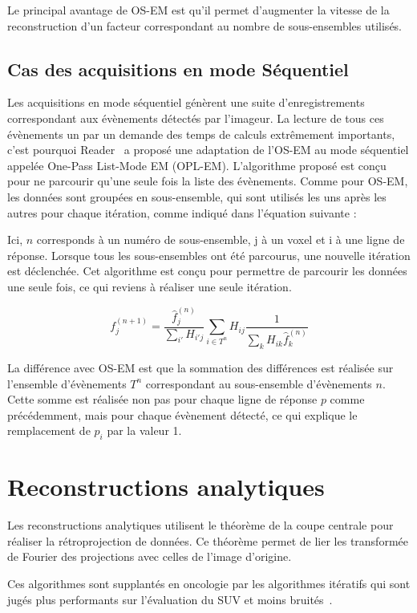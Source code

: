 Le principal avantage de OS-EM est qu'il permet d'augmenter la vitesse de la reconstruction d'un facteur correspondant au nombre de sous-ensembles utilisés.

	\subsection{Cas des acquisitions en mode Séquentiel}
\label{lab:OPLEM}

Les acquisitions en mode séquentiel génèrent une suite d'enregistrements correspondant aux évènements détectés par l'imageur. La lecture de tous ces évènements un par un demande des temps de calculs extrêmement importants, c'est pourquoi Reader~\cite{reader2002one} a proposé une adaptation de l'OS-EM au mode séquentiel appelée One-Pass List-Mode EM (OPL-EM). L'algorithme proposé est conçu pour ne parcourir qu'une seule fois la liste des évènements. Comme pour OS-EM, les données sont groupées en sous-ensemble, qui sont utilisés les uns après les autres pour chaque itération, comme indiqué dans l'équation suivante :

Ici, $n$ corresponds à un numéro de sous-ensemble, j à un voxel et i à une ligne de réponse. Lorsque tous les sous-ensembles ont été parcourus, une nouvelle itération est déclenchée. Cet algorithme est conçu pour permettre de parcourir les données une seule fois, ce qui reviens à réaliser une seule itération.

\begin{equation}
	f_j^{(n+1)}=\frac{\hat{f}_j^{(n)}}{\sum\limits_{i'}H_{i'j}}\sum\limits_{i \in T^n}H_{ij}\frac{1}{\sum\limits_{k}H_{ik}\hat{f}_k^{(n)}}
\label{eq:OSEM_seq}
\end{equation}

La différence avec OS-EM est que la sommation des différences est réalisée sur l'ensemble d'évènements $T^n$ correspondant au sous-ensemble d'évènements $n$. Cette somme est réalisée non pas pour chaque ligne de réponse $p$ comme précédemment, mais pour chaque évènement détecté, ce qui explique le remplacement de $p_i$ par la valeur 1.
		
	\section{Reconstructions analytiques}

Les reconstructions analytiques utilisent le théorème de la coupe centrale pour réaliser la rétroprojection de données. Ce théorème permet de lier les transformée de Fourier des projections avec celles de l'image d'origine. 
 
Ces algorithmes sont supplantés en oncologie par les algorithmes itératifs qui sont jugés plus performants sur l'évaluation du SUV et moins bruités~\cite{schoder2004clinical}.

